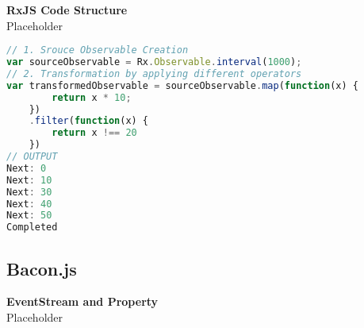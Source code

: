 \textbf{RxJS Code Structure}\\
Placeholder
\begin{lstlisting}[language=JavaScript, caption=RxJS Simple Example, label={lst:RxJS_Simple_Example}]
// 1. Srouce Observable Creation
var sourceObservable = Rx.Observable.interval(1000);
// 2. Transformation by applying different operators
var transformedObservable = sourceObservable.map(function(x) {
		return x * 10;
	})
	.filter(function(x) {
		return x !== 20
	})
// OUTPUT
Next: 0
Next: 10
Next: 30
Next: 40
Next: 50
Completed
\end{lstlisting}

\subsection{Bacon.js}

\textbf{EventStream and Property}\\
Placeholder


